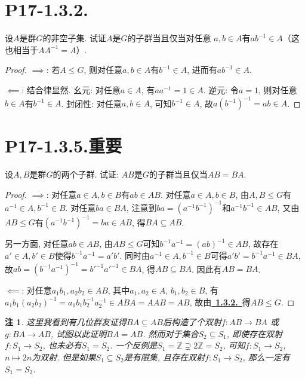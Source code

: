 \documentclass[12pt, a4paper, fontset=windows]{ctexart}
\newcommand{\Z}{\mathbb{Z}}
\newcommand{\kh}[1]{（{#1}）} %
\newcommand{\myref}[2][]{\hyperref[#1]{\color{blue}\ {#2}\ }}
\newtheorem*{remark}{注}
\begin{document}
\section*{P17-1.3.2.}
\label{subgroup}

设$A$是群$G$的非空子集. 试证$A$是$G$的子群当且仅当对任意
$a,b\in A$有$ab^{-1}\in A$\kh{这也相当于$AA^{-1}=A$}. 

\begin{proof}
$\implies$: 
若$A\le G$, 则对任意$a,b\in A$有$b^{-1}\in A$, 进而有$ab^{-1}\in A$. 

$\impliedby$: 
结合律显然. 
幺元: 对任意$a\in A$, 有$aa^{-1}=1\in A$. 
逆元: 令$a=1$, 则对任意$b\in A$有$b^{-1}\in A$. 
封闭性: 对任意$a,b\in A$, 可知$b^{-1}\in A$, 
故$a(b^{-1})^{-1}=ab\in A$. 
\end{proof}

\section*{P17-1.3.5.\normalsize 重要}

设$A,B$是群$G$的两个子群. 试证: $AB$是$G$的子群当且仅当$AB=BA$. 

\begin{proof}
$\implies$: 对任意$a\in A,b\in B$有$ab\in AB$. 对任意$a\in A,b\in B$, 
由$A,B\le G$有$a^{-1}\in A,b^{-1}\in B$. 对任意$ba\in BA$, 
注意到$ba=(a^{-1}b^{-1})^{-1}$和$a^{-1}b^{-1}\in AB$, 
又由$AB\le G$有$(a^{-1}b^{-1})^{-1}=ba\in AB$, 得$BA\subseteq AB$. 

另一方面, 对任意$ab\in AB$, 由$AB\le G$可知$b^{-1}a^{-1}=
(ab)^{-1}\in AB$, 故存在$a'\in A,b'\in B$使得$b^{-1}a^{-1}=a'b'$. 
同时由$a^{-1}\in A,b^{-1}\in B$可得$a'b'=b^{-1}a^{-1}\in BA$,
故$ab=(b^{-1}a^{-1})^{-1}=b'^{-1}a'^{-1}\in BA$, 得$AB\subseteq BA$. 
因此有$AB=BA$. 

$\impliedby$: 对任意$a_1b_1,a_2b_2\in AB$, 其中$a_1,a_2\in A$, $b_1,b_2\in B$, 
有$a_1b_1(a_2b_2)^{-1}=a_1b_1b_2^{-1}a_2^{-1}\in ABA=AAB=AB$, 
故由\myref[subgroup]{\bf 1.3.2.}得$AB\le G$. 
\end{proof}

\begin{remark}
这里我看到有几位群友证得$BA\subseteq AB$后构造了个双射$f:AB\to BA$
或$g:BA\to AB$, 试图以此证明$BA=AB$. 然而对于集合$S_2\subseteq S_1$, 
即使存在双射$f:S_1\to S_2$, 也未必有$S_1=S_2$. 一个反例是$S_1=\Z\supsetneq 2\Z=S_2$, 
可知$f:S_1\to S_2$, $n\mapsto 2n$为双射. 但是如果$S_1\subseteq S_2$是有限集, 
且存在双射$f:S_1\to S_2$, 那么一定有$S_1=S_2$. 
\end{remark}
\end{document}
